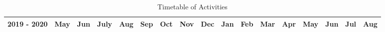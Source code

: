 \begin{landscape}
\begin{table}[H]
\caption{Timetable of Activities} \vspace{0.25em}
\label{tab:ganttChart}
\begin{tabular}{|l|l|l|l|l|l|l|l|l|l|l|l|l|l|l|l|l|}
\hline
2019 - 2020                                                                & May                                                                                                      & Jun                                                                                                      & July                                                                                                     & Aug                                                                                                      & Sep                                                                                                      & Oct                                                                                                         & Nov                                                                                                      & Dec                                                                            & Jan                                                                                                      & Feb                                                                                                      & Mar                                                                                                      & Apr                                                                            & May                                                                                                      & Jun                                                                                                      & Jul                                                                                                      & Aug                        \\ \hline

\end{tabular}
\end{table}
\end{landscape}
